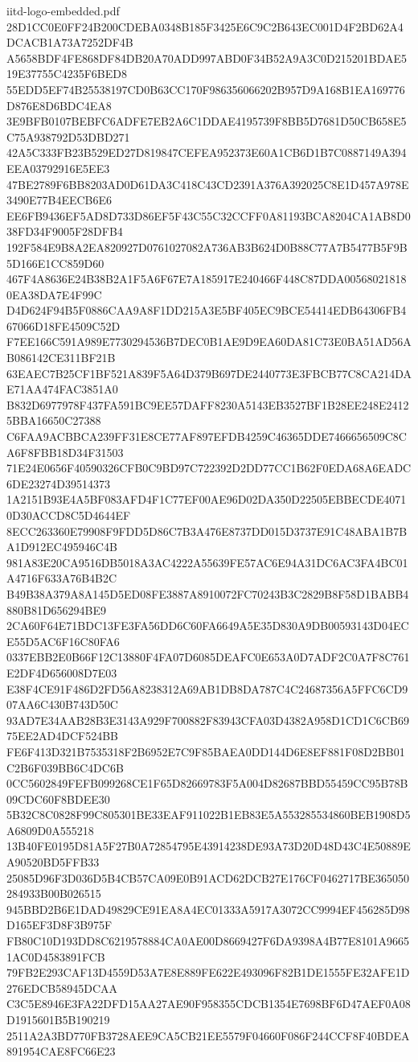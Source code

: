\begin{filecontents*}[overwrite]{iitd-logo-embedded.pdf}
28D1CC0E0FF24B200CDEBA0348B185F3425E6C9C2B643EC001D4F2BD62A4DCACB1A73A7252DF4B
A5658BDF4FE868DF84DB20A70ADD997ABD0F34B52A9A3C0D215201BDAE519E37755C4235F6BED8
55EDD5EF74B25538197CD0B63CC170F986356066202B957D9A168B1EA169776D876E8D6BDC4EA8
3E9BFB0107BEBFC6ADFE7EB2A6C1DDAE4195739F8BB5D7681D50CB658E5C75A938792D53DBD271
42A5C333FB23B529ED27D819847CEFEA952373E60A1CB6D1B7C0887149A394EEA03792916E5EE3
47BE2789F6BB8203AD0D61DA3C418C43CD2391A376A392025C8E1D457A978E3490E77B4EECB6E6
EE6FB9436EF5AD8D733D86EF5F43C55C32CCFF0A81193BCA8204CA1AB8D038FD34F9005F28DFB4
192F584E9B8A2EA820927D0761027082A736AB3B624D0B88C77A7B5477B5F9B5D166E1CC859D60
467F4A8636E24B38B2A1F5A6F67E7A185917E240466F448C87DDA005680218180EA38DA7E4F99C
D4D624F94B5F0886CAA9A8F1DD215A3E5BF405EC9BCE54414EDB64306FB467066D18FE4509C52D
F7EE166C591A989E7730294536B7DEC0B1AE9D9EA60DA81C73E0BA51AD56AB086142CE311BF21B
63EAEC7B25CF1BF521A839F5A64D379B697DE2440773E3FBCB77C8CA214DAE71AA474FAC3851A0
B832D6977978F437FA591BC9EE57DAFF8230A5143EB3527BF1B28EE248E24125BBA16650C27388
C6FAA9ACBBCA239FF31E8CE77AF897EFDB4259C46365DDE7466656509C8CA6F8FBB18D34F31503
71E24E0656F40590326CFB0C9BD97C722392D2DD77CC1B62F0EDA68A6EADC6DE23274D39514373
1A2151B93E4A5BF083AFD4F1C77EF00AE96D02DA350D22505EBBECDE40710D30ACCD8C5D4644EF
8ECC263360E79908F9FDD5D86C7B3A476E8737DD015D3737E91C48ABA1B7BA1D912EC495946C4B
981A83E20CA9516DB5018A3AC4222A55639FE57AC6E94A31DC6AC3FA4BC01A4716F633A76B4B2C
B49B38A379A8A145D5ED08FE3887A8910072FC70243B3C2829B8F58D1BABB4880B81D656294BE9
2CA60F64E71BDC13FE3FA56DD6C60FA6649A5E35D830A9DB00593143D04ECE55D5AC6F16C80FA6
0337EBB2E0B66F12C13880F4FA07D6085DEAFC0E653A0D7ADF2C0A7F8C761E2DF4D656008D7E03
E38F4CE91F486D2FD56A8238312A69AB1DB8DA787C4C24687356A5FFC6CD907AA6C430B743D50C
93AD7E34AAB28B3E3143A929F700882F83943CFA03D4382A958D1CD1C6CB6975EE2AD4DCF524BB
FE6F413D321B7535318F2B6952E7C9F85BAEA0DD144D6E8EF881F08D2BB01C2B6F039BB6C4DC6B
0CC5602849FEFB099268CE1F65D82669783F5A004D82687BBD55459CC95B78B09CDC60F8BDEE30
5B32C8C0828F99C805301BE33EAF911022B1EB83E5A553285534860BEB1908D5A6809D0A555218
13B40FE0195D81A5F27B0A72854795E43914238DE93A73D20D48D43C4E50889EA90520BD5FFB33
25085D96F3D036D5B4CB57CA09E0B91ACD62DCB27E176CF0462717BE365050284933B00B026515
945BBD2B6E1DAD49829CE91EA8A4EC01333A5917A3072CC9994EF456285D98D165EF3D8F3B975F
FB80C10D193DD8C6219578884CA0AE00D8669427F6DA9398A4B77E8101A96651AC0D4583891FCB
79FB2E293CAF13D4559D53A7E8E889FE622E493096F82B1DE1555FE32AFE1D276EDCB58945DCAA
C3C5E8946E3FA22DFD15AA27AE90F958355CDCB1354E7698BF6D47AEF0A08D1915601B5B190219
2511A2A3BD770FB3728AEE9CA5CB21EE5579F04660F086F244CCF8F40BDEA891954CAE8FC66E23

\end{filecontents*}
